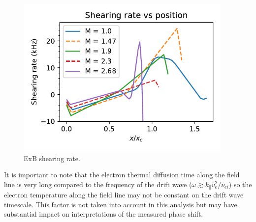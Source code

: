 \begin{figure}
    \centering
    \includegraphics[width=300pt]{figures/extra/ExB_shearing-rate_zoomed.pdf}
    \caption[ExB shearing rate]{ExB shearing rate.}
    \label{fig_extra:ExB_shearing-rate}
\end{figure}


It is important to note that the electron thermal diffusion time along the field line is very long compared to the frequency of the drift wave ($\omega \gtrsim k_\parallel \bar{v}_e^2 / \nu_{ei}$) \cite{Goldston_textbook} so the electron temperature along the field line may not be constant on the drift wave timescale. This factor is not taken into account in this analysis but may have substantial impact on interpretations of the measured phase shift.

